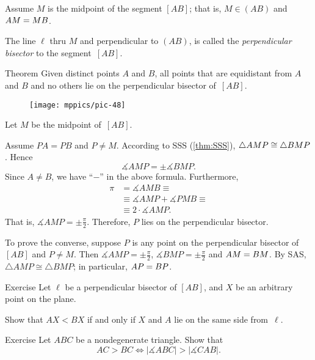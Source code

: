 Assume $M$ is the midpoint of the segment $[AB]$;
that is, $M\in(A B)$ and $A M = M B$.

The line $\ell$ thru $M$ and perpendicular to $(AB)$,
is called the \emph{perpendicular bisector} to the segment~$[AB]$. 

\begin{thm}[\abs]{Theorem}\label{thm:perp-bisect}
Given distinct points $A$ and $B$,
all points that are equidistant from $A$ and $B$ and no
others lie on the perpendicular bisector of~$[A B]$.
\end{thm}

\begin{wrapfigure}{o}{34mm}
\centering
\texttt{[image: mppics/pic-48]}
\end{wrapfigure}

 Let $M$ be the midpoint of~$[A B]$.

Assume $P A= P B$ and $P\ne M$.
According to SSS (\ref{thm:SSS}),
$\triangle A M P \cong\triangle B M P$.
Hence 
$$\measuredangle A M P=\pm \measuredangle B M P.$$  
Since $A\not=B$, we have ``$-$'' in the above formula.
Furthermore,
\begin{align*}
\pi
&=
\measuredangle A M B
\equiv
\\
&\equiv\measuredangle A M P+\measuredangle P M B
\equiv
\\
&\equiv
2\cdot \measuredangle A M P.
\end{align*}
That is, $\measuredangle A M P
=
\pm
\tfrac\pi2$. 
Therefore, $P$ lies on the perpendicular bisector.


To prove the converse, 
suppose $P$ 
is any point on the perpendicular bisector of $[A B]$ and $P\ne M$.
Then $\measuredangle A M P=\pm \tfrac\pi2$, 
$\measuredangle B M P=\pm \tfrac\pi2$ and
$A M=B M$.
By SAS, $\triangle A M P\cong \triangle B M P$;
in particular, $A P= B P$.\qeds


\begin{thm}{Exercise}\label{ex:pbisec-side}
Let $\ell$ be a perpendicular bisector of $[A B]$, and $X$ be an arbitrary point on the plane.

Show that 
$AX<BX$ if and only if $X$ and $A$ lie on the same side from~$\ell$.
\end{thm}

\begin{thm}{Exercise}\label{ex:side-angle}
Let $ABC$ be a nondegenerate triangle.
Show that 
\[AC>BC\iff|\measuredangle ABC|>|\measuredangle CAB|.\] 
\end{thm}

